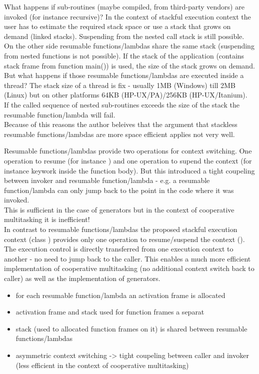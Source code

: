 What happens if sub-routines (maybe compiled, from third-party vendors) are
invoked (for instance recursive)? In the context of stackful execution context
the user has to estimate the required stack space or use a stack that grows on
demand (linked stacks). Suspending from the nested call stack is still
possible.\\
On the other side resumable functions/lambdas share the same stack (suspending
from nested functions is not possible). If the stack of the application
(contains stack frame from function main()) is used, the size of the stack grows
on demand. But what happens if those resumable functions/lambdas are executed
inside a thread? The stack size of a thread is fix - usually 1MB (Windows) till
2MB (Linux) but on other platforms 64KB (HP-UX/PA)/256KB (HP-UX/Itanium).\\
If the called sequence of nested sub-routines exceeds the size of the stack the
resumable function/lambda will fail.\\
\newline
Because of this reasons the author beleives that the argument that stackless
resumable functions/lambdas are more space efficient applies not very well.

Resumable functions/lambdas provide two operations for context switching. One
operation to resume (for instance \rlop) and one
operation to supend the context (for instance keywork \yield inside the function
body). But this introduced a tight coupeling between invoker and resumable
function/lambda - e.g. a resumable function/lambda can only jump back to the
point in the code where it was invoked.\\
This is sufficient in the case of generators but in the context of cooperative
multitasking it is inefficient!\\
In contrast to resumable functions/lambdas the proposed stackful execution
context (class \ectx) provides only one operation to resume/suspend
the context (\ectxop). The execution control is directly transferred from one
execution context to another - no need to jump back to the caller. This enables
a much more efficient implementation of cooperative multitasking (no additional
context switch back to caller) as well as the implementation of generators.

\begin{itemize}
    \item   for each resumable function/lambda an activation frame is allocated
    \item   activation frame and stack used for function frames a separat
    \item   stack (used to allocated function frames on it) is shared between
            resumable functions/lambdas
    \item   asymmetric context switching -> tight coupeling between caller and
            invoker (less efficient in the context of cooperative multitasking)
\end{itemize}

